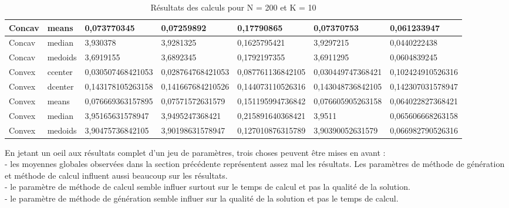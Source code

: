 ﻿\documentclass{meta}
\begin{document}
{\begin{table}[]
\begin{adjustwidth}{-3cm}{}
\begin{tabular}{|l|l|l|l|l|l|l|}
Concav             & means          & 0,073770345       & 0,07259892             & 0,17790865          & 0,07370753            & 0,061233947        \\ \hline
Concav             & median         & 3,930378          & 3,9281325              & 0,1625795421        & 3,9297215             & 0,0440222438       \\ \hline
Concav             & medoids        & 3,6919155         & 3,6892345              & 0,1792197355        & 3,6911295             & 0,0604839245       \\ \hline
Convex             & ccenter        & 0,030507468421053 & 0,028764768421053      & 0,087761136842105   & 0,030449747368421     & 0,102424910526316  \\ \hline
Convex             & dcenter        & 0,143178105263158 & 0,141667684210526      & 0,144073110526316   & 0,143048736842105     & 0,142307031578947  \\ \hline
Convex             & means          & 0,076669363157895 & 0,07571572631579       & 0,151195994736842   & 0,076605905263158     & 0,064022827368421  \\ \hline
Convex             & median         & 3,95165631578947  & 3,9495247368421        & 0,215891640368421   & 3,9511                & 0,065606668263158  \\ \hline
Convex             & medoids        & 3,90475736842105  & 3,90198631578947       & 0,127010876315789   & 3,90390052631579      & 0,066982790526316  \\ \hline
\end{tabular}
\caption{Résultats des calculs pour N = 200 et K = 10}
\label{tab:my-table}
\end{adjustwidth}
\end{table}

En jetant un oeil aux résultats complet d'un jeu de paramètres, trois choses peuvent être mises en avant :\\
- les moyennes globales observées dans la section précédente représentent assez mal les résultats. Les paramètres de méthode de génération et méthode de calcul influent aussi beaucoup sur les résultats.\\
- le paramètre de méthode de calcul semble influer surtout sur le temps de calcul et pas la qualité de la solution.\\
- le paramètre de méthode de génération semble influer sur la qualité de la solution et pas le temps de calcul.\\

}
\end{document}
